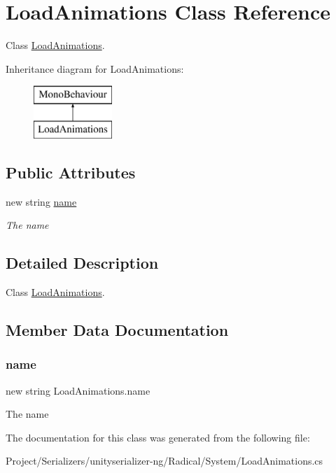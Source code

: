\hypertarget{class_load_animations}{}\section{Load\+Animations Class Reference}
\label{class_load_animations}


Class \hyperlink{class_load_animations}{Load\+Animations}.  


Inheritance diagram for Load\+Animations\+:\begin{figure}[H]
\begin{center}
\leavevmode
\includegraphics[height=2.000000cm]{class_load_animations}
\end{center}
\end{figure}
\subsection*{Public Attributes}
\begin{DoxyCompactItemize}
\item 
new string \hyperlink{class_load_animations_aaac48acb2bd106455dd1c95ea73da4bd}{name}
\begin{DoxyCompactList}\small\item\em The name \end{DoxyCompactList}\end{DoxyCompactItemize}


\subsection{Detailed Description}
Class \hyperlink{class_load_animations}{Load\+Animations}. 



\subsection{Member Data Documentation}
\mbox{\label{class_load_animations_aaac48acb2bd106455dd1c95ea73da4bd}} 
\subsubsection{\texorpdfstring{name}{name}}
{\footnotesize\ttfamily new string Load\+Animations.\+name}



The name 



The documentation for this class was generated from the following file\+:\begin{DoxyCompactItemize}
\item 
Project/\+Serializers/unityserializer-\/ng/\+Radical/\+System/Load\+Animations.\+cs\end{DoxyCompactItemize}
